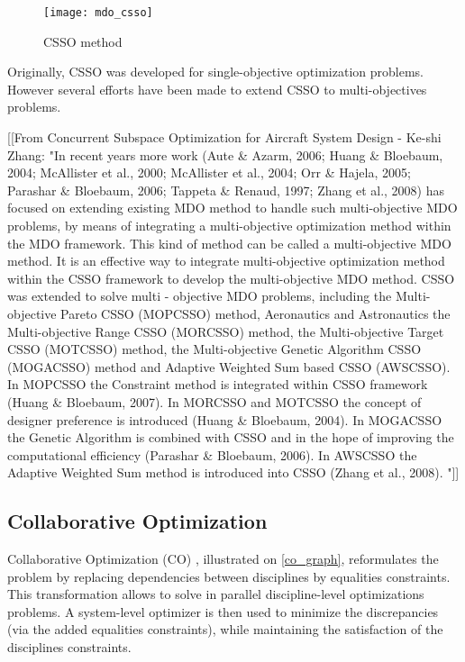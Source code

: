 \begin{wrapfigure}{r}{0.5\textwidth}
\centering
\texttt{[image: mdo\_csso]}
\caption{CSSO method}\label{csso_graph}
\end{wrapfigure}

Originally, CSSO was developed for single-objective optimization problems. However several efforts have been made to extend CSSO to multi-objectives problems.

[[From Concurrent Subspace Optimization for Aircraft System Design -  Ke-shi Zhang:
"In recent years more work (Aute \& Azarm, 2006; Huang \& Bloebaum, 2004; McAllister et al., 2000; McAllister et al., 2004; Orr \& Hajela, 2005; Parashar \& Bloebaum, 2006; Tappeta \& Renaud, 1997; Zhang et al., 2008) has focused on extending existing MDO method to handle such multi-objective MDO problems, by means of integrating a multi-objective optimization method within the MDO framework. This kind of method can be called a multi-objective MDO method.
It is an effective way to integrate multi-objective optimization method within the CSSO framework to develop the multi-objective MDO method. CSSO was extended to solve multi - objective MDO problems, including the Multi-objective Pareto CSSO (MOPCSSO) method, Aeronautics and Astronautics the Multi-objective Range CSSO (MORCSSO) method, the Multi-objective Target CSSO (MOTCSSO) method, the Multi-objective Genetic Algorithm CSSO (MOGACSSO) method and Adaptive Weighted Sum based CSSO (AWSCSSO). In MOPCSSO the Constraint method is integrated within CSSO framework (Huang \& Bloebaum, 2007). In MORCSSO and MOTCSSO the concept of designer preference is introduced (Huang \& Bloebaum, 2004). In MOGACSSO the Genetic Algorithm is combined with CSSO and in the hope of improving the computational efficiency (Parashar \& Bloebaum, 2006). In AWSCSSO the Adaptive Weighted Sum method is introduced into CSSO (Zhang et al., 2008). "]]

\subsection{Collaborative Optimization}

Collaborative Optimization (CO) \cite{Ilan:1994:MOM:887207}, illustrated on \figurename{} \ref{co_graph}, reformulates the problem by replacing dependencies between disciplines by equalities constraints. This transformation allows to solve in parallel discipline-level optimizations problems. A system-level optimizer is then used to minimize the discrepancies (via the added equalities constraints), while maintaining the satisfaction of the disciplines constraints.

